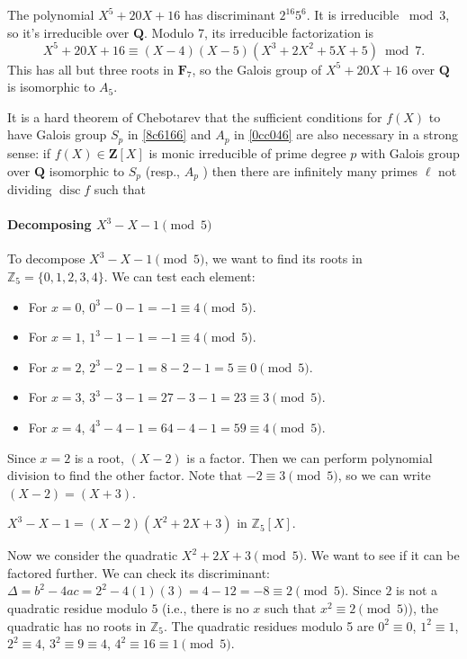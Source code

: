 \begin{example}
The polynomial $X^5+20 X+16$ has discriminant $2^{16} 5^6$. It is irreducible $\bmod 3$, so it's irreducible over $\mathbf{Q}$. Modulo 7, its irreducible factorization is
\[
X^5+20 X+16 \equiv(X-4)(X-5)\left(X^3+2 X^2+5 X+5\right) \bmod 7 .
\]This has all but three roots in $\mathbf{F}_7$, so the Galois group of $X^5+20 X+16$ over $\mathbf{Q}$ is isomorphic to $A_5$.
\end{example}
\begin{remark}
It is a hard theorem of Chebotarev that the sufficient conditions for $f(X)$ to have Galois group $S_p$ in \cref{8c6166}  and $A_p$ in \cref{0cc046}  are also necessary in a strong sense: if $f(X) \in \mathbf{Z}[X]$ is monic irreducible of prime degree $p$ with Galois group over $\mathbf{Q}$ isomorphic to $S_p$ (resp., $A_p$ ) then there are infinitely many primes $\ell$ not dividing $\operatorname{disc} f$ such that
\end{remark}
\paragraph{Decomposing \texorpdfstring{$X^3 - X - 1 \pmod{5}$}{X^3 - X - 1 pmod5}}

To decompose $X^3 - X - 1 \pmod{5}$, we want to find its roots in $\mathbb{Z}_5 = \{0, 1, 2, 3, 4\}$. We can test each element:

\begin{itemize}
	\item For $x = 0$, $0^3 - 0 - 1 = -1 \equiv 4 \pmod{5}$.
	\item For $x = 1$, $1^3 - 1 - 1 = -1 \equiv 4 \pmod{5}$.
	\item For $x = 2$, $2^3 - 2 - 1 = 8 - 2 - 1 = 5 \equiv 0 \pmod{5}$.
	\item For $x = 3$, $3^3 - 3 - 1 = 27 - 3 - 1 = 23 \equiv 3 \pmod{5}$.
	\item For $x = 4$, $4^3 - 4 - 1 = 64 - 4 - 1 = 59 \equiv 4 \pmod{5}$.
\end{itemize}

Since $x = 2$ is a root, $(X - 2)$ is a factor. Then we can perform polynomial division to find the other factor.
Note that $-2 \equiv 3 \pmod{5}$, so we can write $(X - 2) = (X + 3)$.

$X^3 - X - 1 = (X - 2)(X^2 + 2X + 3)$ in $\mathbb{Z}_5[X]$.

Now we consider the quadratic $X^2 + 2X + 3 \pmod{5}$. We want to see if it can be factored further. We can check its discriminant:
$\Delta = b^2 - 4ac = 2^2 - 4(1)(3) = 4 - 12 = -8 \equiv 2 \pmod{5}$.
Since $2$ is not a quadratic residue modulo $5$ (i.e., there is no $x$ such that $x^2 \equiv 2 \pmod{5}$), the quadratic has no roots in $\mathbb{Z}_5$. The quadratic residues modulo 5 are $0^2 \equiv 0$, $1^2 \equiv 1$, $2^2 \equiv 4$, $3^2 \equiv 9 \equiv 4$, $4^2 \equiv 16 \equiv 1 \pmod{5}$.

